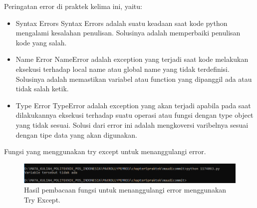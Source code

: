 \hfill \break
Peringatan error di praktek kelima ini, yaitu:
\begin{itemize}
	\item Syntax Errors
	Syntax Errors adalah suatu keadaan saat kode python mengalami kesalahan penulisan. Solusinya adalah memperbaiki penulisan kode yang salah.
	
	\item Name Error
	NameError adalah exception yang terjadi saat kode melakukan eksekusi terhadap local name atau global name yang tidak terdefinisi. Solusinya adalah memastikan variabel atau function yang dipanggil ada atau tidak salah ketik.
	
	\item Type Error
	TypeError adalah exception yang akan terjadi apabila pada saat dilakukannya eksekusi terhadap suatu operasi atau fungsi dengan type object yang tidak sesuai. Solusi dari error ini adalah mengkoversi varibelnya sesuai dengan tipe data yang akan digunakan.
\end{itemize}

\hfill \break
Fungsi yang menggunakan try except untuk menanggulangi error.



\begin{figure}[H]
	\includegraphics[width=12cm]{figures/chapter5/1174063/5.png}
	\centering
	\caption{Hasil pembacaan fungsi untuk menanggulangi error menggunakan Try Except.}
\end{figure}
